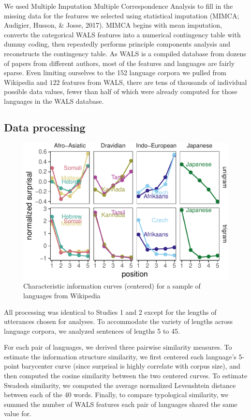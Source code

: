 \documentclass[man,floatsintext]{apa6}
\begin{document}
We used Multiple Imputation Multiple Correspondence Analysis to fill in the missing data for the features we selected using statistical imputation (MIMCA; Audigier, Husson, \& Josse, 2017). MIMCA begins with mean imputation, converts the categorical WALS features into a numerical contingency table with dummy coding, then repeatedly performs principle components analysis and reconstructs the contingency table. As WALS is a compiled database from dozens of papers from different authors, most of the features and languages are fairly sparse. Even limiting ourselves to the 152 language corpora we pulled from Wikipedia and \(122\) features from WALS, there are tens of thousands of individual possible data values, fewer than half of which were already computed for those languages in the WALS database.

\hypertarget{data-processing-1}{%
\subsection{Data processing}\label{data-processing-1}}

\begin{figure}
\centering
\includegraphics{figs/diff-languages-1.pdf}
\caption{\label{fig:diff-languages}Characteristic information curves (centered) for a sample of languages from Wikipedia}
\end{figure}

All processing was identical to Studies 1 and 2 except for the lengths of utterances chosen for analyses. To accommodate the variety of lengths across language corpora, we analyzed sentences of lengths 5 to 45.

For each pair of languages, we derived three pairwise similarity measures. To estimate the information structure similarity, we first centered each language's 5-point barycenter curve (since surprisal is highly correlate with corpus size), and then computed the cosine similarity between the two centered curves. To estimate Swadesh similarity, we computed the average normalized Levenshtein distance between each of the 40 words. Finally, to compare typological similarity, we summed the number of WALS features each pair of languages shared the same value for.
\end{document}
